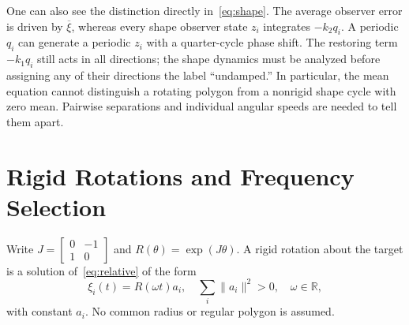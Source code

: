 \documentclass[conference]{IEEEtran}
\newcommand{\R}{\mathbb{R}}
\newcommand{\norm}[1]{\lVert#1\rVert}
\newcommand{\avg}[1]{\overline{#1}}
\begin{document}
One can also see the distinction directly in~\eqref{eq:shape}. The average observer error is driven by $\avg\xi$, whereas every shape observer state $z_i$ integrates $-k_2q_i$. A periodic $q_i$ can generate a periodic $z_i$ with a quarter-cycle phase shift. The restoring term $-k_1q_i$ still acts in all directions; the shape dynamics must be analyzed before assigning any of their directions the label ``undamped.'' In particular, the mean equation cannot distinguish a rotating polygon from a nonrigid shape cycle with zero mean. Pairwise separations and individual angular speeds are needed to tell them apart.

\section{Rigid Rotations and Frequency Selection}
\label{sec:rotation}
Write $J=\left[\begin{smallmatrix}0&-1\\1&0\end{smallmatrix}\right]$ and $R(\theta)=\exp(J\theta)$. A rigid rotation about the target is a solution of~\eqref{eq:relative} of the form
\begin{equation}
 \xi_i(t)=R(\omega t)a_i,
 \quad \sum_i\norm{a_i}^2>0,\quad \omega\in\R,
 \label{eq:ansatz}
\end{equation}
with constant $a_i$. No common radius or regular polygon is assumed.
\end{document}
